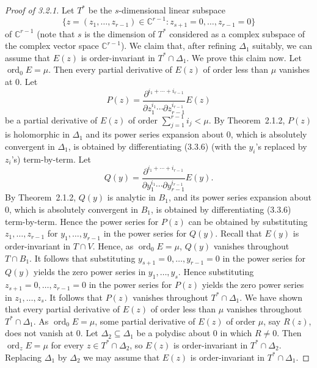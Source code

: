 \documentclass[11pt]{article}
\theoremstyle{plain}
\theoremstyle{definition}
\newcommand{\C}{\mathbb{C}}
\DeclareMathOperator{\ord}{ord}
\begin{document}
\begin{proof}[Proof of 3.2.1]
Let $T^*$ be the $s$-dimensional linear subspace
\[
\{ z = (z_1, \ldots, z_{r-1}) \in \C^{r-1} :
z_{s+1} = 0, \ldots, z_{r-1} = 0 \}
\]
of $\C^{r-1}$ (note that $s$ is the dimension of $T^*$ considered as a
complex subspace of the complex vector space $\C^{r-1}$). We claim
that, after refining $\Delta_1$ suitably, we can assume that $E(z)$ is
order-invariant in $T^* \cap \Delta_1$. We prove this claim now. Let
$\ord_0 E = \mu$. Then every partial derivative of $E(z)$ of order
less than $\mu$ vanishes at $0$. Let
\[
P(z) = \frac{\partial^{i_1 + \cdots + i_{r-1}}}
{\partial z_1^{i_1} \cdots \partial z_{r-1}^{i_{r-1}}} E(z)
\]
be a partial derivative of $E(z)$ of order
$\sum_{j=1}^{r-1} i_j < \mu$. By Theorem~2.1.2, $P(z)$ is holomorphic
in $\Delta_1$ and its power series expansion about $0$, which is
absolutely convergent in $\Delta_1$, is obtained by differentiating
(3.3.6) (with the $y_i$'s replaced by $z_i$'s) term-by-term. Let
\[
Q(y) = \frac{\partial^{i_1 + \cdots + i_{r-1}}}
{\partial y_1^{i_1} \cdots \partial y_{r-1}^{i_{r-1}}} E(y).
\]
By Theorem~2.1.2, $Q(y)$ is analytic in $B_1$, and its power series
expansion about $0$, which is absolutely convergent in $B_1$, is
obtained by differentiating (3.3.6) term-by-term. Hence the power
series for $P(z)$ can be obtained by substituting
$z_1, \ldots, z_{r-1}$ for $y_1, \ldots, y_{r-1}$ in the power series
for $Q(y)$. Recall that $E(y)$ is order-invariant in $T \cap V$.
Hence, as $\ord_0 E = \mu$, $Q(y)$ vanishes throughout $T \cap B_1$.
It follows that substituting $y_{s+1} = 0, \ldots, y_{r-1} = 0$ in
the power series for $Q(y)$ yields the zero power series in
$y_1, \ldots, y_s$. Hence substituting $z_{s+1} = 0, \ldots,
z_{r-1} = 0$ in the power series for $P(z)$ yields the zero power
series in $z_1, \ldots, z_s$. It follows that $P(z)$ vanishes
throughout $T^* \cap \Delta_1$. We have shown that every partial
derivative of $E(z)$ of order less than $\mu$ vanishes throughout
$T^* \cap \Delta_1$. As $\ord_0 E = \mu$, some partial derivative of
$E(z)$ of order $\mu$, say $R(z)$, does not vanish at $0$. Let
$\Delta_2 \subseteq \Delta_1$ be a polydisc about $0$ in which
$R \ne 0$. Then $\ord_z E = \mu$ for every $z \in T^* \cap \Delta_2$,
so $E(z)$ is order-invariant in $T^* \cap \Delta_2$. Replacing
$\Delta_1$ by $\Delta_2$ we may assume that $E(z)$ is order-invariant
in $T^* \cap \Delta_1$.


\end{proof}
\end{document}
